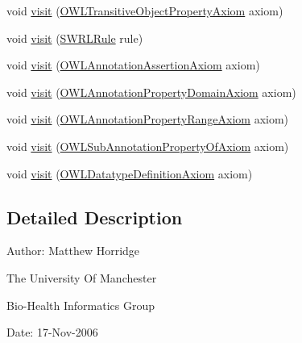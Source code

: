 \begin{DoxyCompactItemize}
void \hyperlink{classorg_1_1semanticweb_1_1owlapi_1_1util_1_1_o_w_l_axiom_visitor_adapter_a7641bf10d056add795d23a50ac5d24cb}{visit} (\hyperlink{interfaceorg_1_1semanticweb_1_1owlapi_1_1model_1_1_o_w_l_transitive_object_property_axiom}{O\-W\-L\-Transitive\-Object\-Property\-Axiom} axiom)
\item 
void \hyperlink{classorg_1_1semanticweb_1_1owlapi_1_1util_1_1_o_w_l_axiom_visitor_adapter_a28cf168e7c3f2ae3154f8aebcc3c1b62}{visit} (\hyperlink{interfaceorg_1_1semanticweb_1_1owlapi_1_1model_1_1_s_w_r_l_rule}{S\-W\-R\-L\-Rule} rule)
\item 
void \hyperlink{classorg_1_1semanticweb_1_1owlapi_1_1util_1_1_o_w_l_axiom_visitor_adapter_ace4db79ff431c62a455f0105309ecda1}{visit} (\hyperlink{interfaceorg_1_1semanticweb_1_1owlapi_1_1model_1_1_o_w_l_annotation_assertion_axiom}{O\-W\-L\-Annotation\-Assertion\-Axiom} axiom)
\item 
void \hyperlink{classorg_1_1semanticweb_1_1owlapi_1_1util_1_1_o_w_l_axiom_visitor_adapter_a888931893b701af44cf2c3a4da32d151}{visit} (\hyperlink{interfaceorg_1_1semanticweb_1_1owlapi_1_1model_1_1_o_w_l_annotation_property_domain_axiom}{O\-W\-L\-Annotation\-Property\-Domain\-Axiom} axiom)
\item 
void \hyperlink{classorg_1_1semanticweb_1_1owlapi_1_1util_1_1_o_w_l_axiom_visitor_adapter_afb5e296761dc092d0a2d5fccd262caa0}{visit} (\hyperlink{interfaceorg_1_1semanticweb_1_1owlapi_1_1model_1_1_o_w_l_annotation_property_range_axiom}{O\-W\-L\-Annotation\-Property\-Range\-Axiom} axiom)
\item 
void \hyperlink{classorg_1_1semanticweb_1_1owlapi_1_1util_1_1_o_w_l_axiom_visitor_adapter_abbb38dee20e096574abffe113a95ccbc}{visit} (\hyperlink{interfaceorg_1_1semanticweb_1_1owlapi_1_1model_1_1_o_w_l_sub_annotation_property_of_axiom}{O\-W\-L\-Sub\-Annotation\-Property\-Of\-Axiom} axiom)
\item 
void \hyperlink{classorg_1_1semanticweb_1_1owlapi_1_1util_1_1_o_w_l_axiom_visitor_adapter_a41ed572e8a2da108153100ba1c2d616f}{visit} (\hyperlink{interfaceorg_1_1semanticweb_1_1owlapi_1_1model_1_1_o_w_l_datatype_definition_axiom}{O\-W\-L\-Datatype\-Definition\-Axiom} axiom)
\end{DoxyCompactItemize}


\subsection{Detailed Description}
Author\-: Matthew Horridge\par
 The University Of Manchester\par
 Bio-\/\-Health Informatics Group\par
 Date\-: 17-\/\-Nov-\/2006\par
\par
 

